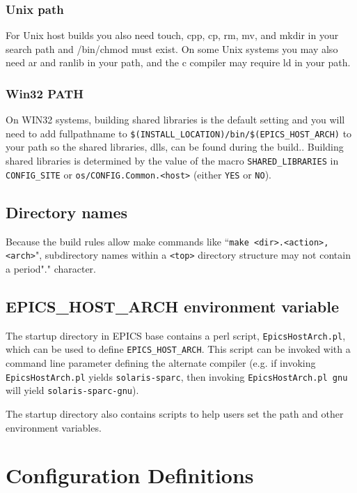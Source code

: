 \subsubsection{Unix path}

For Unix host builds you also need touch, cpp, cp, rm, mv, and mkdir in your search path and /bin/chmod must exist. On 
some Unix systems you may also need ar and ranlib in your path, and the c compiler may require ld in your path.

\subsubsection{Win32 PATH}

On WIN32 systems, building shared libraries is the default setting and you will need to add fullpathname to 
\verb|$(INSTALL_LOCATION)/bin/$(EPICS_HOST_ARCH)| to your path so the shared libraries, dlls, can be found during 
the build.. Building shared libraries is determined by the value of the macro \verb|SHARED_LIBRARIES| in \verb|CONFIG_SITE| or 
\verb|os/CONFIG.Common.<host>| (either \verb|YES| or \verb|NO|).

\subsection{Directory names}

Because the build rules allow make commands like ``\verb|make <dir>.<action>,<arch>|", subdirectory names within a \verb|<top>| 
directory structure may not contain a period"." character.

\subsection{EPICS\_HOST\_ARCH environment variable}

The startup directory in EPICS base contains a perl script, \verb|EpicsHostArch.pl|, which can be used to define 
\verb|EPICS_HOST_ARCH|. This script can be invoked with a command line parameter defining the alternate compiler (e.g. if 
invoking \verb|EpicsHostArch.pl| yields \verb|solaris-sparc|, then invoking \verb|EpicsHostArch.pl gnu| will yield \verb|solaris-sparc-gnu|).

The startup directory also contains scripts to help users set the path and other environment variables.

\section{Configuration Definitions}

